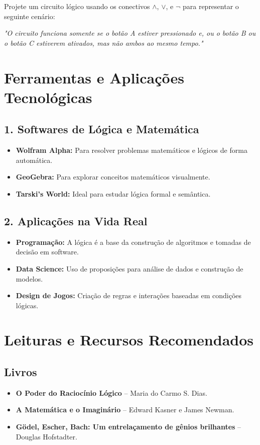 \documentclass[a4paper,12pt]{book}
\begin{document}
Projete um circuito lógico usando os conectivos $\land$, $\lor$, e $\neg$ para representar o seguinte cenário:

\textit{"O circuito funciona somente se o botão A estiver pressionado e, ou o botão B ou o botão C estiverem ativados, mas não ambos ao mesmo tempo."}

\section{Ferramentas e Aplicações Tecnológicas}

\subsection*{1. Softwares de Lógica e Matemática}
\begin{itemize}
    \item \textbf{Wolfram Alpha:} Para resolver problemas matemáticos e lógicos de forma automática.
    \item \textbf{GeoGebra:} Para explorar conceitos matemáticos visualmente.
    \item \textbf{Tarski’s World:} Ideal para estudar lógica formal e semântica.
\end{itemize}

\subsection*{2. Aplicações na Vida Real}
\begin{itemize}
    \item \textbf{Programação:} A lógica é a base da construção de algoritmos e tomadas de decisão em software.
    \item \textbf{Data Science:} Uso de proposições para análise de dados e construção de modelos.
    \item \textbf{Design de Jogos:} Criação de regras e interações baseadas em condições lógicas.
\end{itemize}

\section{Leituras e Recursos Recomendados}

\subsection*{Livros}
\begin{itemize}
    \item \textbf{O Poder do Raciocínio Lógico} – Maria do Carmo S. Dias.
    \item \textbf{A Matemática e o Imaginário} – Edward Kasner e James Newman.
    \item \textbf{Gödel, Escher, Bach: Um entrelaçamento de gênios brilhantes} – Douglas Hofstadter.
\end{itemize}
\end{document}
